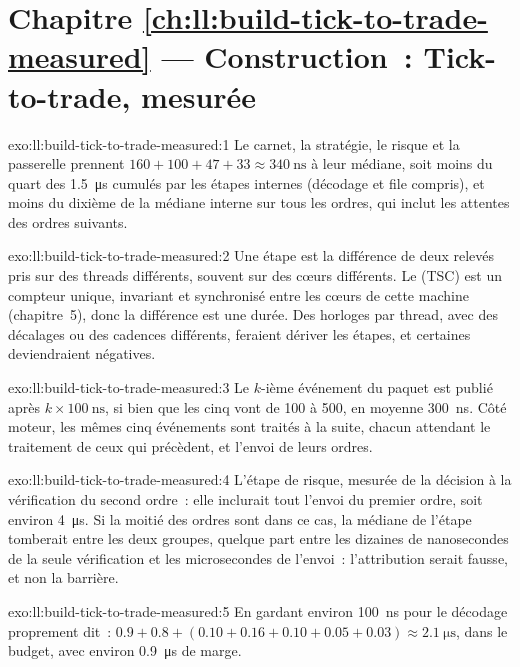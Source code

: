 \section*{Chapitre \ref{ch:ll:build-tick-to-trade-measured} --- Construction~: Tick-to-trade, mesurée}

\begin{solution}{exo:ll:build-tick-to-trade-measured:1}
Le carnet, la stratégie, le risque et la passerelle prennent $160 + 100 + 47 + 33 \approx \qty{340}{\nano\second}$ à leur médiane, soit moins du quart
des \qty{1.5}{\micro\second} cumulés par les étapes internes (décodage et file compris), et moins du dixième de la médiane interne
sur tous les ordres, qui inclut les attentes des ordres suivants.
\end{solution}

\begin{solution}{exo:ll:build-tick-to-trade-measured:2}
Une étape est la différence de deux relevés pris sur des threads différents, souvent sur des cœurs différents.
Le  (TSC) est un compteur unique, invariant et synchronisé entre les cœurs de cette machine (chapitre~5), donc la différence est une durée.
Des horloges par thread, avec des décalages ou des cadences différents, feraient dériver les étapes, et certaines deviendraient négatives.
\end{solution}

\begin{solution}{exo:ll:build-tick-to-trade-measured:3}
Le $k$-ième événement du paquet est publié après $k \times \qty{100}{\nano\second}$, si bien que les cinq vont de 100 à 500, en moyenne
\qty{300}{\nano\second}. Côté moteur, les mêmes cinq événements sont traités à la suite, chacun attendant le traitement de ceux qui précèdent,
et l'envoi de leurs ordres.
\end{solution}

\begin{solution}{exo:ll:build-tick-to-trade-measured:4}
L'étape de risque, mesurée de la décision à la vérification du second ordre~: elle inclurait tout l'envoi du premier
ordre, soit environ \qty{4}{\micro\second}. Si la moitié des ordres sont dans ce cas, la médiane de l'étape tomberait entre les deux groupes,
quelque part entre les dizaines de nanosecondes de la seule vérification et les microsecondes de l'envoi~: l'attribution serait fausse, et non la barrière.
\end{solution}

\begin{solution}{exo:ll:build-tick-to-trade-measured:5}
En gardant environ \qty{100}{\nano\second} pour le décodage proprement dit~: $0.9 + 0.8 + (0.10 + 0.16 + 0.10 + 0.05 + 0.03) \approx
\qty{2.1}{\micro\second}$, dans le budget, avec environ \qty{0.9}{\micro\second} de marge.
\end{solution}

